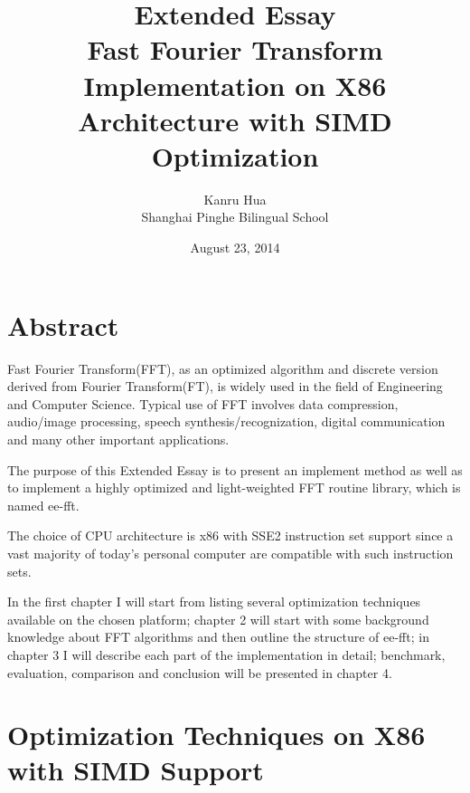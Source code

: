\documentclass[a4paper]{report}
\begin{document}
\title{\Huge{Extended Essay} \\[2cm] \Large{Fast Fourier Transform Implementation on X86 Architecture with SIMD Optimization} \\[1cm]}
\author{Kanru Hua \\[0.5cm] Shanghai Pinghe Bilingual School}
\date{August 23, 2014}
\maketitle

\newpage

\chapter*{Abstract} \indent

	Fast Fourier Transform(FFT), as an optimized algorithm and discrete version derived from Fourier Transform(FT), is widely used in the field of Engineering and Computer Science. %
	Typical use of FFT involves data compression, audio/image processing, speech synthesis/recognization, digital communication and many other important applications.
	
	The purpose of this Extended Essay is to present an implement method as well as to implement a highly optimized and light-weighted FFT routine library, which is named ee-fft.

	The choice of CPU architecture is x86 with SSE2 instruction set support since a vast majority of today's personal computer are compatible with such instruction sets.
	
	In the first chapter I will start from listing several optimization techniques available on the chosen platform; chapter 2 will start with some background knowledge about FFT algorithms and then outline the structure of ee-fft; in chapter 3 I will describe each part of the implementation in detail; benchmark, evaluation, comparison and conclusion will be presented in chapter 4.

\newpage
\tableofcontents

\newpage

\chapter{Optimization Techniques on X86 with SIMD Support} \indent
\end{document}
